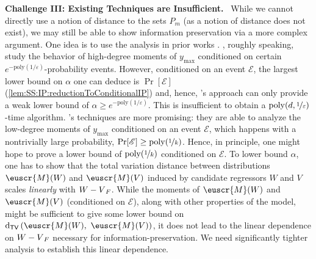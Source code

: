 \documentclass[11pt,letterpaper]{article}
\theoremstyle{plain}
\theoremstyle{definition}
\theoremstyle{remark}
\newcommand{\inparen}[1]{\ensuremath{\left(#1\right)}}
\let\norm\relax
\newcommand{\norm}[1]{\ensuremath{\left\lVert #1 \right\rVert}}
\newcommand{\evE}{\ensuremath{\mathscr{E}}}
\newcommand{\tv}[2]{\operatorname{d}_{\mathsf{TV}}{\inparen{#1,#2}}}
\newcommand{\nfrac}[2]{\nicefrac{#1}{#2}}
\newcommand{\poly}{\mathrm{poly}}
\newcommand{\eps}{\varepsilon}
\newcommand{\customcal}[1]{\euscr{#1}}
\newcommand{\cM}{\customcal{M}}
\renewcommand{\paragraph}[1]{\medskip \noindent\textbf{#1}~}
\newcommand{\ymax}{y_{\max}}
\begin{document}
        \paragraph{{Challenge III: Existing Techniques are Insufficient.}}
        While we cannot directly use a notion of distance to the sets $P_m$ (as a notion of distance does not exist), we may still be able to show information preservation via a more complex argument. 
            One idea is to use the analysis in prior works \cite{cherapanamjeri2023selfselection,gaitonde2024selfselection}.
            \cite{cherapanamjeri2023selfselection}, roughly speaking, study the behavior of high-degree moments of $\ymax$ conditioned on certain $e^{-\poly(1/\eps)}$-probability events.
            However, conditioned on an event $\evE$, the largest lower bound on $\alpha$ one can deduce is $\Pr[\evE]$ (\cref{lem:SS:IP:reductionToConditionalIP}) and, hence, \cite{cherapanamjeri2023selfselection}'s approach can only provide a weak lower bound of $\alpha \geq e^{-\poly(1/\eps)}$.
            This is insufficient to obtain a $\poly(d,\nfrac{1}{\eps})$-time algorithm.
            \cite{gaitonde2024selfselection}'s techniques are more promising: they are able to analyze the low-degree moments of $\ymax$ conditioned on an event $\evE$, which happens with a nontrivially large probability, $\Pr[\evE]\geq \poly(\nfrac{1}{k})$.
            Hence, in principle, one might hope to prove a lower bound of $\poly(\nfrac{1}{k})$ conditioned on $\evE$.
            To lower bound $\alpha$, one has to show that the total variation distance between distributions $\cM(W)$ and $\cM(V)$ induced by candidate regressors $W$ and $V$ scales \textit{linearly} with $\norm{W-V}_F$.
            While the moments of $\cM(W)$ and $\cM(V)$ (conditioned on $\evE$), along with other properties of the model, might be sufficient to give some lower bound on $\tv{\cM(W)}{~\cM(V)}$,
            it does not lead to the linear dependence on $\norm{W-V}_F$ necessary for information-preservation. 
            We need significantly tighter analysis to establish this linear dependence.
            
\end{document}
